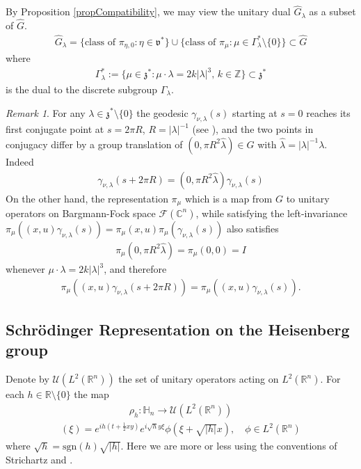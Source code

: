 \documentclass[11pt]{amsart}
\theoremstyle{plain}
\theoremstyle{definition}
\theoremstyle{remark}
\newtheorem{remark}[theorem]{Remark}
\numberwithin{equation}{section}
\def\fz{\mathfrak{z}}
\def\fv{\mathfrak{v}}
\def\cF{\mathcal{F}}
\def\mz{\setminus\{0\}}
\def\C{{\mathbb C}}%
\def\Z{{\mathbb Z}}%
\numberwithin{equation}{section}
\begin{document}
By Proposition \ref{propCompatibility}, we may view the unitary dual $\widehat{G}_\lambda$ as a subset of $\widehat{G}$. 
\begin{align*}
	\widehat{G}_\lambda=\{\text{class of }\pi_{\eta, 0}: \eta\in \fv^*\}\cup \{\text{class of } \pi_\mu:  \mu\in \Gamma_\lambda^*\mz \}\subset \widehat{G}
\end{align*}
where
\begin{align*}
	\Gamma_\lambda^*:=\{\mu\in \fz^*:  \mu\cdot \lambda=2k|\lambda|^3, \, k\in \Z\}\subset \fz^*
\end{align*}
is the dual to the discrete subgroup $\Gamma_\lambda$. 

\begin{remark}\label{conjRmk}
	For any $\lambda\in \fz^*\mz$ the geodesic $\gamma_{\nu, \lambda}(s)$ starting at $s=0$ reaches its first conjugate point at $s=2\pi R$, $R=|\lambda|^{-1}$ (see \cite{montgomeryTourSubriemannianGeometries2006}), and the two points in conjugacy differ by a group translation of $(0, \pi R^2 \hat{\lambda})\in G$ with $\hat{\lambda}=|\lambda|^{-1}\lambda$. Indeed
	\begin{align*}
		\gamma_{\nu, \lambda}(s+2\pi R)=(0, \pi R^2\hat{\lambda})\gamma_{\nu, \lambda}(s)
	\end{align*}
	On the other hand, the representation $\pi_{\mu}$ which is a map from $G$ to unitary operators on Bargmann-Fock space $\cF(\C^n)$, while satisfying the left-invariance $\pi_{\mu}((x, u)\gamma_{\nu, \lambda}(s)) =\pi_{\mu}(x, u)\pi_{\mu}(\gamma_{\nu, \lambda}(s))$ also satisfies
	\begin{align*}
		\pi_\mu(0, \pi R^2\hat{\lambda})=\pi_{\mu}(0, 0)=I
	\end{align*}
	whenever $\mu\cdot\lambda=2k|\lambda|^3$, and therefore
	\begin{align*}
		\pi_\mu((x, u)\gamma_{\nu, \lambda}(s+2\pi R))=\pi_\mu((x, u)\gamma_{\nu, \lambda}(s)).
	\end{align*}
\end{remark}
\subsection{Schr\"{o}dinger  Representation on the Heisenberg group}
Denote by $\mathcal{U}(L^2(\mathbb{R}^n))$ the set of unitary operators acting on $L^2(\mathbb{R}^n)$. For each $h\in \mathbb{R}\setminus \{0\}$ the map
\begin{align*}
	\rho_h: \mathbb{H}_n\longrightarrow \mathcal{U}(L^2(\mathbb{R}^n))
\end{align*}
\begin{align*}
	[\rho_h(x, y, t)\phi](\xi)=e^{ih(t+\frac{1}{2}xy)}e^{i\sqrt{h}y\xi}\phi(\xi+\sqrt{|h|}x), \quad \phi\in L^2(\mathbb{R}^n)
\end{align*}
where $\sqrt{h}=\text{sgn}(h)\sqrt{|h|}$. Here we are more or less using the conventions of Strichartz \cite[p. 358]{strichartzLpHarmonicAnalysis1991} and \cite{fischerQuantizationNilpotentLie2016}.
\end{document}
